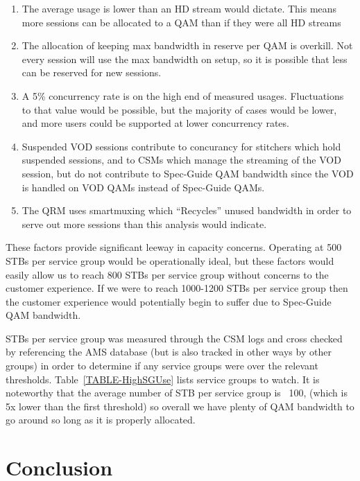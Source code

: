 \documentclass{article}
\begin{document}
\begin{enumerate}
\item The average usage is lower than an HD stream would dictate. This means more sessions can be allocated to a QAM than if they were all HD streams
\item The allocation of keeping max bandwidth in reserve per QAM is overkill. Not every session will use the max bandwidth on setup, so it is possible that less can be reserved for new sessions. 
\item A 5\% concurrency rate is on the high end of measured usages. Fluctuations to that value would be possible, but the majority of cases would be lower, and more users could be supported at lower concurrency rates. 
\item Suspended VOD sessions contribute to concurancy for stitchers which hold suspended sessions, and to CSMs which manage the streaming of the VOD session, but do not contribute to Spec-Guide QAM bandwidth since the VOD is handled on VOD QAMs instead of Spec-Guide QAMs.
\item The QRM uses smartmuxing which ``Recycles'' unused bandwidth in order to serve out more sessions than this analysis would indicate. 
\end{enumerate}
 
These factors provide significant leeway in capacity concerns. Operating at 500 STBs per service group would be operationally ideal, but these factors would easily allow us to reach 800 STBs per service group without concerns to the customer experience. If we were to reach 1000-1200 STBs per service group then the customer experience would potentially begin to suffer due to Spec-Guide QAM bandwidth. 

STBs per service group was measured through the CSM logs and cross checked by referencing the AMS database (but is also tracked in other ways by other groups) in order to determine if any service groups were over the relevant thresholds. Table~\ref{TABLE-HighSGUse} lists service groups to watch. It is noteworthy that the average number of STB per service group is ~100, (which is 5x lower than the first threshold) so overall we have plenty of QAM bandwidth to go around so long as it is properly allocated. 



\section{Conclusion}
\label{SECTION-Conclusion}
\end{document}
